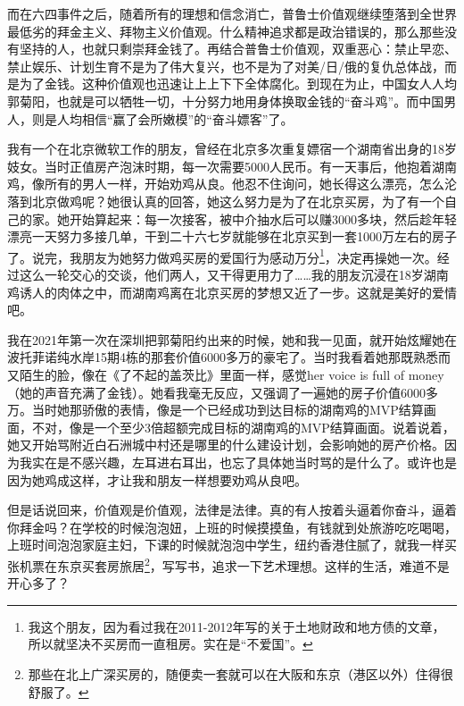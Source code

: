 而在六四事件之后，随着所有的理想和信念消亡，普鲁士价值观继续堕落到全世界最低劣的拜金主义、拜物主义价值观。什么精神追求都是政治错误的，那么那些没有坚持的人，也就只剩崇拜金钱了。再结合普鲁士价值观，双重恶心：禁止早恋、禁止娱乐、计划生育不是为了伟大复兴，也不是为了对美/日/俄的复仇总体战，而是为了金钱。这种价值观也迅速让上上下下全体腐化。到现在为止，中国女人人均郭菊阳，也就是可以牺牲一切，十分努力地用身体换取金钱的``奋斗鸡''。而中国男人，则是人均相信``赢了会所嫩模''的``奋斗嫖客''了。

我有一个在北京微软工作的朋友，曾经在北京多次重复嫖宿一个湖南省出身的18岁妓女。当时正值房产泡沫时期，每一次需要5000人民币。有一天事后，他抱着湖南鸡，像所有的男人一样，开始劝鸡从良。他忍不住询问，她长得这么漂亮，怎么沦落到北京做鸡呢？她很认真的回答，她这么努力是为了在北京买房，为了有一个自己的家。她开始算起来：每一次接客，被中介抽水后可以赚3000多块，然后趁年轻漂亮一天努力多接几单，干到二十六七岁就能够在北京买到一套1000万左右的房子了。说完，我朋友为她努力做鸡买房的爱国行为感动万分\footnote{我这个朋友，因为看过我在2011-2012年写的关于土地财政和地方债的文章，所以就坚决不买房而一直租房。实在是``不爱国''。}，决定再操她一次。经过这么一轮交心的交谈，他们两人，又干得更用力了……我的朋友沉浸在18岁湖南鸡诱人的肉体之中，而湖南鸡离在北京买房的梦想又近了一步。这就是美好的爱情吧。

我在2021年第一次在深圳把郭菊阳约出来的时候，她和我一见面，就开始炫耀她在波托菲诺纯水岸15期4栋的那套价值6000多万的豪宅了。当时我看着她那既熟悉而又陌生的脸，像在《了不起的盖茨比》里面一样，感觉her voice is full of money（她的声音充满了金钱）。她看我毫无反应，又强调了一遍她的房子价值6000多万。当时她那骄傲的表情，像是一个已经成功到达目标的湖南鸡的MVP结算画面，不对，像是一个至少3倍超额完成目标的湖南鸡的MVP结算画面。说着说着，她又开始骂附近白石洲城中村还是哪里的什么建设计划，会影响她的房产价格。因为我实在是不感兴趣，左耳进右耳出，也忘了具体她当时骂的是什么了。或许也是因为她鸡成这样，才让我和朋友一样想要劝鸡从良吧。

但是话说回来，价值观是价值观，法律是法律。真的有人按着头逼着你奋斗，逼着你拜金吗？在学校的时候泡泡妞，上班的时候摸摸鱼，有钱就到处旅游吃吃喝喝，上班时间泡泡家庭主妇，下课的时候就泡泡中学生，纽约香港住腻了，就我一样买张机票在东京买套房旅居\footnote{那些在北上广深买房的，随便卖一套就可以在大阪和东京（港区以外）住得很舒服了。}，写写书，追求一下艺术理想。这样的生活，难道不是开心多了？
